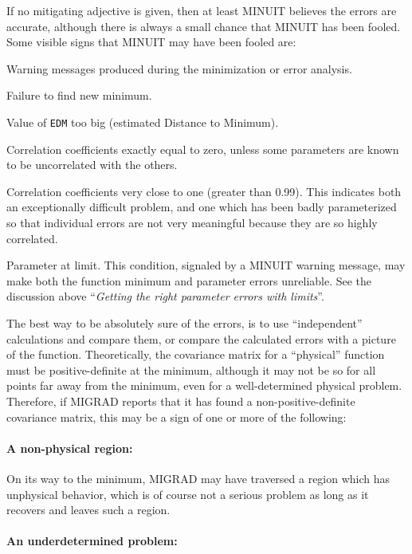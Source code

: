 If no mitigating adjective is given, then at least MINUIT believes
the errors are accurate, although there is always a small chance
that MINUIT has been fooled.
Some visible signs that MINUIT may have been fooled are:

\begin{UL}
\item Warning messages produced during the minimization or error analysis.
\item Failure to find new minimum.
\item Value of \texttt{EDM} too big (estimated Distance to Minimum).
\item Correlation coefficients exactly equal to zero, unless some 
      parameters are known to be uncorrelated with the others.
\item Correlation coefficients very close to one (greater than 0.99).
      This indicates both an exceptionally difficult problem, and one
      which has been badly parameterized so that individual errors are not
      very meaningful because they are so highly correlated.
\item Parameter at limit. This condition, signaled by a MINUIT warning
      message, may make both the function minimum and parameter errors
      unreliable. See the discussion above
      ``{\it Getting the right parameter errors with limits}''.
\end{UL}

The best way to be absolutely sure of the errors, is to use
``independent'' calculations and compare them, or compare the calculated
errors with a picture of the function.
Theoretically, the covariance matrix for a ``physical'' function must be
positive-definite at the minimum, although it may not be so
for all points far away from the minimum, even for a well-determined
physical problem. 
Therefore, if MIGRAD reports that it has found a
non-positive-definite covariance matrix, this may be
a sign of one or more of the following:

\paragraph{A non-physical region:}

On its way to the minimum, MIGRAD may have traversed a region which has
unphysical behavior, which is of course not a serious problem as long
as it recovers and leaves such a region.

\paragraph{An underdetermined problem:}

